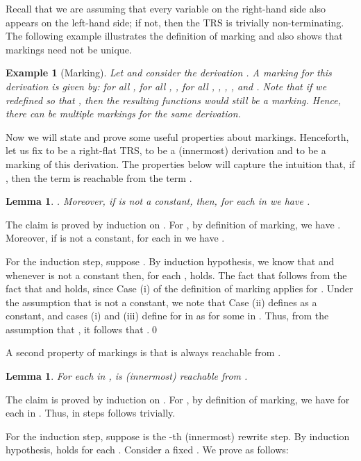 \documentclass{LMCS}
\theoremstyle{plain}
\newtheorem{lemma}[thm]{Lemma}
\newtheorem{example}[thm]{Example}
\begin{document}
\noindent Recall that we are assuming that every variable on the right-hand
side also appears on the left-hand side; if not, then the TRS
is trivially non-terminating.
The following example illustrates the definition of marking and
also shows that markings need not be unique.

\begin{example}[Marking]
\label{example-marking}
Let  and consider
the derivation
.
A marking for this derivation is given by:
 for all ,
 for all ,
,
 for all ,
, 
,
, and
.
Note that if we redefined  so that
, then the resulting functions would still be a marking.
Hence, there can be multiple markings for the same derivation.
\end{example}




Now we will state and prove some useful properties about markings.
Henceforth, let us fix  to be a right-flat TRS,
 to be a (innermost) derivation 
and
 to be a marking of this derivation.
The properties below will capture the intuition
that, if , then the term  
is reachable from the term .

\begin{lemma}\label{lemma-reach0}
.
Moreover, if  is not a constant, then,
for each  in  we have .
\end{lemma}

\proof
The claim is proved by induction on .
For , by definition of marking, we have
. Moreover, if  is not a constant,
for each  in  we have
.

For the induction step,
suppose .
By induction hypothesis, we know that  and
whenever  is not a constant then, for each ,
 holds.
The fact that  follows from the fact
that  and 
holds, since Case (i) of the definition of marking applies for
.
Under the assumption that  is not a constant, we note
that Case (ii) defines  as a constant, and cases (i)
and (iii) define  for  in  as
 for some  in .
Thus, from the assumption
that , it follows that .\qed


A second property of markings is that
 is always reachable from .
\begin{lemma}\label{lemma-reach1}
For each  in ,
 is (innermost) reachable from  .
\end{lemma}
\proof
The claim is proved by induction on .
For , by definition of marking, we have  for
each  in . Thus,
 in  steps follows trivially.

For the induction step,
suppose  is the
-th (innermost) rewrite step.
By induction hypothesis,  holds for each .
Consider a fixed . We prove
 as follows:
\end{document}
